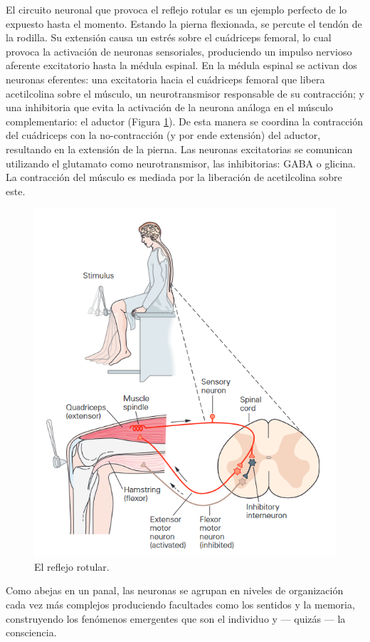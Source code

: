 El circuito neuronal que provoca el reflejo rotular es un ejemplo perfecto de lo expuesto hasta el momento. Estando la pierna flexionada, se percute el tendón de la rodilla. Su extensión causa un estrés sobre el cuádriceps femoral, lo cual provoca la activación de neuronas sensoriales, produciendo un impulso nervioso aferente excitatorio hasta la médula espinal. En la médula espinal se activan dos neuronas eferentes: una excitatoria hacia el cuádriceps femoral que libera acetilcolina sobre el músculo, un neurotransmisor responsable de su contracción; y una inhibitoria que evita la activación de la neurona análoga en el músculo complementario: el aductor (Figura \ref{sn}). De esta manera se coordina la contracción del cuádriceps con la no-contracción (y por ende extensión) del aductor, resultando en la extensión de la pierna. Las neuronas excitatorias se comunican utilizando el glutamato como neurotransmisor, las inhibitorias: GABA o glicina. La contracción del músculo es mediada por la liberación de acetilcolina sobre este.

\begin{figure}[H]
	\centering

	\includegraphics[width=.8\linewidth]{media/7-sn.png}
	\caption{El reflejo rotular.}
	\label{sn}
\end{figure}

Como abejas en un panal, las neuronas se agrupan en niveles de organización cada vez más complejos produciendo facultades como los sentidos y la memoria, construyendo los fenómenos emergentes que son el individuo y --- quizás --- la consciencia.


